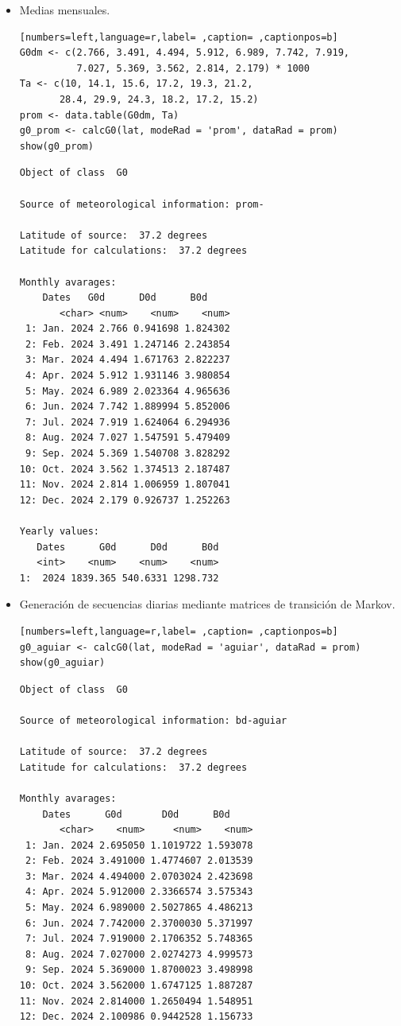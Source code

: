 \begin{itemize}
\item Medias mensuales.
\begin{lstlisting}[numbers=left,language=r,label= ,caption= ,captionpos=b]
G0dm <- c(2.766, 3.491, 4.494, 5.912, 6.989, 7.742, 7.919,
          7.027, 5.369, 3.562, 2.814, 2.179) * 1000
Ta <- c(10, 14.1, 15.6, 17.2, 19.3, 21.2,
       28.4, 29.9, 24.3, 18.2, 17.2, 15.2)
prom <- data.table(G0dm, Ta) 
g0_prom <- calcG0(lat, modeRad = 'prom', dataRad = prom)
show(g0_prom)
\end{lstlisting}

\begin{verbatim}
Object of class  G0 

Source of meteorological information: prom- 

Latitude of source:  37.2 degrees
Latitude for calculations:  37.2 degrees

Monthly avarages:
	Dates   G0d      D0d      B0d
       <char> <num>    <num>    <num>
 1: Jan. 2024 2.766 0.941698 1.824302
 2: Feb. 2024 3.491 1.247146 2.243854
 3: Mar. 2024 4.494 1.671763 2.822237
 4: Apr. 2024 5.912 1.931146 3.980854
 5: May. 2024 6.989 2.023364 4.965636
 6: Jun. 2024 7.742 1.889994 5.852006
 7: Jul. 2024 7.919 1.624064 6.294936
 8: Aug. 2024 7.027 1.547591 5.479409
 9: Sep. 2024 5.369 1.540708 3.828292
10: Oct. 2024 3.562 1.374513 2.187487
11: Nov. 2024 2.814 1.006959 1.807041
12: Dec. 2024 2.179 0.926737 1.252263

Yearly values:
   Dates      G0d      D0d      B0d
   <int>    <num>    <num>    <num>
1:  2024 1839.365 540.6331 1298.732
\end{verbatim}

\item Generación de secuencias diarias mediante matrices de transición de Markov.
\begin{lstlisting}[numbers=left,language=r,label= ,caption= ,captionpos=b]
g0_aguiar <- calcG0(lat, modeRad = 'aguiar', dataRad = prom)
show(g0_aguiar)
\end{lstlisting}

\begin{verbatim}
Object of class  G0 

Source of meteorological information: bd-aguiar 

Latitude of source:  37.2 degrees
Latitude for calculations:  37.2 degrees

Monthly avarages:
	Dates      G0d       D0d      B0d
       <char>    <num>     <num>    <num>
 1: Jan. 2024 2.695050 1.1019722 1.593078
 2: Feb. 2024 3.491000 1.4774607 2.013539
 3: Mar. 2024 4.494000 2.0703024 2.423698
 4: Apr. 2024 5.912000 2.3366574 3.575343
 5: May. 2024 6.989000 2.5027865 4.486213
 6: Jun. 2024 7.742000 2.3700030 5.371997
 7: Jul. 2024 7.919000 2.1706352 5.748365
 8: Aug. 2024 7.027000 2.0274273 4.999573
 9: Sep. 2024 5.369000 1.8700023 3.498998
10: Oct. 2024 3.562000 1.6747125 1.887287
11: Nov. 2024 2.814000 1.2650494 1.548951
12: Dec. 2024 2.100986 0.9442528 1.156733


\end{verbatim}
\end{itemize}
